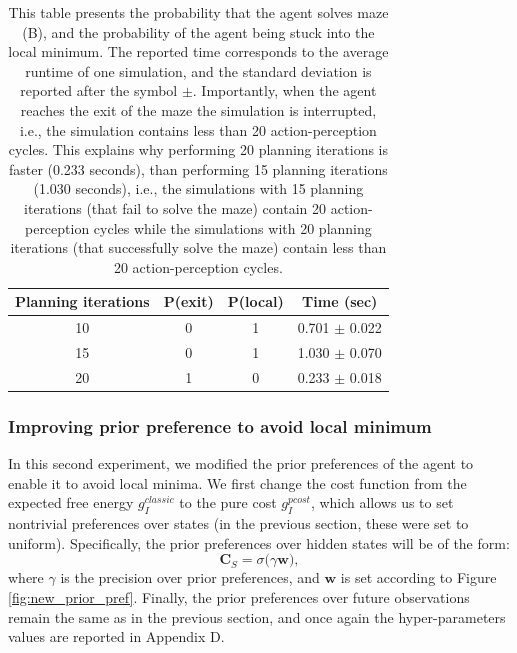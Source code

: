 \documentclass[twoside,11pt]{article}
\begin{document}
\begin{table}[H]
\centering
\begin{tabular}{ |c|c|c|c| }
 \hline
 Planning iterations & P(exit) & P(local) & Time (sec)\\
 \hline
 10 & 0 & 1 & 0.701 $\pm$ 0.022\\
 15 & 0 & 1 & 1.030 $\pm$ 0.070\\
 20 & 1 & 0 & 0.233 $\pm$ 0.018\\
 \hline
\end{tabular}
\caption{This table presents the probability that the agent solves maze (B), and the probability of the agent being stuck into the local minimum. The reported time corresponds to the average runtime of one simulation, and the standard deviation is reported after the symbol $\pm$. Importantly, when the agent reaches the exit of the maze the simulation is interrupted, i.e., the simulation contains less than 20 action-perception cycles. This explains why performing 20 planning iterations is faster (0.233 seconds), than performing 15 planning iterations (1.030 seconds), i.e., the simulations with 15 planning iterations (that fail to solve the maze) contain 20 action-perception cycles while the simulations with 20 planning iterations (that successfully solve the maze) contain less than 20 action-perception cycles.}
\label{tab:1}
\end{table}

\subsubsection{Improving prior preference to avoid local minimum} \label{sec:pp_and_lm_mp}

In this second experiment, we modified the prior preferences of the agent to enable it to avoid local minima. We first change the cost function from the expected free energy $g^{classic}_I$ to the pure cost $g^{pcost}_I$, which allows us to set nontrivial preferences over states (in the previous section, these were set to uniform). Specifically, the prior preferences over hidden states will be of the form:
$$\bm{C}_S = \sigma\big(\gamma \bm{w}\big),$$
where $\gamma$ is the precision over prior preferences, and $\bm{w}$ is set according to Figure \ref{fig:new_prior_pref}. Finally, the prior preferences over future observations remain the same as in the previous section, and once again the hyper-parameters values are reported in Appendix D.
\end{document}
